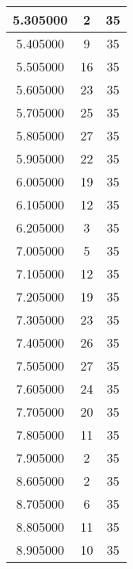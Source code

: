 \begin{longtable}[htbp]{|c|c|c|}
5.305000 & 2 & 35 \\ \hline
5.405000 & 9 & 35 \\ \hline
5.505000 & 16 & 35 \\ \hline
5.605000 & 23 & 35 \\ \hline
5.705000 & 25 & 35 \\ \hline
5.805000 & 27 & 35 \\ \hline
5.905000 & 22 & 35 \\ \hline
6.005000 & 19 & 35 \\ \hline
6.105000 & 12 & 35 \\ \hline
6.205000 & 3 & 35 \\ \hline
7.005000 & 5 & 35 \\ \hline
7.105000 & 12 & 35 \\ \hline
7.205000 & 19 & 35 \\ \hline
7.305000 & 23 & 35 \\ \hline
7.405000 & 26 & 35 \\ \hline
7.505000 & 27 & 35 \\ \hline
7.605000 & 24 & 35 \\ \hline
7.705000 & 20 & 35 \\ \hline
7.805000 & 11 & 35 \\ \hline
7.905000 & 2 & 35 \\ \hline
8.605000 & 2 & 35 \\ \hline
8.705000 & 6 & 35 \\ \hline
8.805000 & 11 & 35 \\ \hline
8.905000 & 10 & 35 \\ \hline
\end{longtable}
